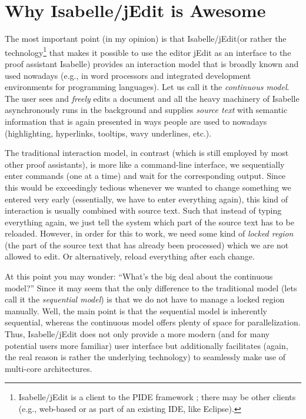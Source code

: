 \documentclass{easychair}
\newcommand\isa{Isa\-belle\xspace}
\newcommand\jedit{jEdit\xspace}
\newcommand\isajedit{\isa/\hspace{0pt}\jedit}
\begin{document}
\section{\label{sec:motiv}Why \isajedit is Awesome}

The most important point (in my opinion) is that \isajedit (or rather the
technology\footnote{\isajedit is a client to the PIDE framework \cite{Wenzel_Wolff2011};
there may be other clients (e.g., web-based or as part of an existing IDE, like
Eclipse).}
that makes it possible to use the editor \jedit as an interface to the
proof assistant \isa) provides an interaction model that is broadly known
and used nowadays (e.g., in word processors and integrated development
environments for programming languages). Let us call it the \emph{continuous model}.
The user sees and \emph{freely} edits a document and all the heavy
machinery of \isa asynchronously runs in the background and supplies
\emph{source text} with semantic information that is again presented in ways
people are used to nowadays (highlighting, hyperlinks, tooltips, wavy
underlines, etc.).

The traditional interaction model, in contrast (which is still employed by most
other proof assistants), is more like a command-line
interface, we sequentially enter commands (one at a time) and wait for the
corresponding output. Since this would be exceedingly tedious whenever we wanted
to change something we entered very early (essentially, we have to enter
everything again), this kind of interaction is usually combined with source
text. Such that instead of typing everything again, we just tell the system
which part of the source text has to be reloaded. However, in order for this to
work, we need some kind of \emph{locked region} (the part of the source text
that has already been processed) which we are not allowed to edit. Or
alternatively, reload everything after each change.



At this point you may wonder: ``What's the big deal about the continuous model?''
Since it may seem that the only difference to the traditional model (lets call
it the \emph{sequential model}) is that we do not have to manage a locked region
manually. Well, the main point is that the sequential model is inherently
sequential, whereas the continuous model offers plenty of space for
parallelization. Thus, \isajedit does not only provide a more modern (and for many
potential users more familiar) user interface but additionally facilitates
(again, the real reason is rather the underlying technology) to seamlessly make
use of multi-core architectures.
\end{document}
